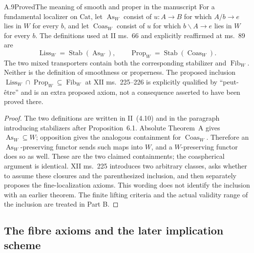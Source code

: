 \begin{claim}{A.9}{Proved}{The meaning of smooth and proper in the manuscript}
For a fundamental localizer on $\mathrm{Cat}$, let $\operatorname{As}_W$ consist of $u:A\to B$ for which $A/b\to e$ lies in $W$ for every $b$, and let $\operatorname{Coas}_W$ consist of $u$ for which $b\backslash A\to e$ lies in $W$ for every $b$. The definitions used at II ms.~66 and explicitly reaffirmed at ms.~89 are
\[
\operatorname{Liss}_W=\operatorname{Stab}(\operatorname{As}_W),
\qquad
\operatorname{Prop}_W=\operatorname{Stab}(\operatorname{Coas}_W).
\]
The two mixed transporters contain both the corresponding stabilizer and $\operatorname{Fib}_W$. Neither is the definition of smoothness or properness. The proposed inclusion
$\operatorname{Liss}_W\cap\operatorname{Prop}_W\subseteq\operatorname{Fib}_W$
at XII ms.~225--226 is explicitly qualified by ``peut-\^etre'' and is an extra proposed axiom, not a consequence asserted to have been proved there.
\end{claim}
\begin{proof}
The two definitions are written in II~(4.10) and in the paragraph introducing stabilizers after Proposition~6.1. Absolute Theorem~A gives $\operatorname{As}_W\subseteq W$; opposition gives the analogous containment for $\operatorname{Coas}_W$. Therefore an $\operatorname{As}_W$-preserving functor sends such maps into $W$, and a $W$-preserving functor does so as well. These are the two claimed containments; the coaspherical argument is identical. XII ms.~225 introduces two arbitrary classes, asks whether to assume these closures and the parenthesized inclusion, and then separately proposes the fine-localization axioms. This wording does not identify the inclusion with an earlier theorem. The finite lifting criteria and the actual validity range of the inclusion are treated in Part B.
\end{proof}

\subsection{The fibre axioms and the later implication scheme}

